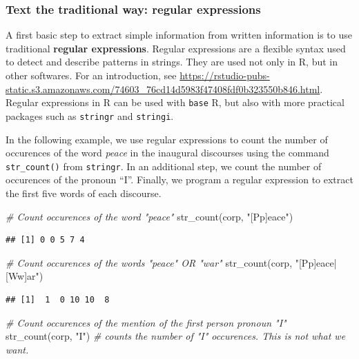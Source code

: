 \documentclass[
  12pt,
]{style/krantz}
\newenvironment{Shaded}{\begin{snugshade}}{\end{snugshade}}
\newcommand{\CommentTok}[1]{\textcolor[rgb]{0.56,0.35,0.01}{\textit{#1}}}
\newcommand{\FunctionTok}[1]{\textcolor[rgb]{0.00,0.00,0.00}{#1}}
\newcommand{\NormalTok}[1]{#1}
\newcommand{\StringTok}[1]{\textcolor[rgb]{0.31,0.60,0.02}{#1}}
\begin{document}
\hfill\break

\hypertarget{text-the-traditional-way-regular-expressions}{%
\subsubsection{Text the traditional way: regular expressions}\label{text-the-traditional-way-regular-expressions}}

A first basic step to extract simple information from written information is to use traditional \textbf{regular expressions}. Regular expressions are a flexible syntax used to detect and describe patterns in strings. They are used not only in R, but in other softwares. For an introduction, see \url{https://rstudio-pubs-static.s3.amazonaws.com/74603_76cd14d5983f47408fdf0b323550b846.html}. Regular expressions in R can be used with \texttt{base} R, but also with more practical packages such as \texttt{stringr} and \texttt{stringi}.

In the following example, we use regular expressions to count the number of occurences of the word \emph{peace} in the inaugural discourses using the command \texttt{str\_count()} from \texttt{stringr}. In an additional step, we count the number of occurences of the pronoun ``I''. Finally, we program a regular expression to extract the first five words of each discourse.

\begin{Shaded}
\begin{Highlighting}[]
\CommentTok{\# Count occurences of the word "peace"}
\FunctionTok{str\_count}\NormalTok{(corp, }\StringTok{"[Pp]eace"}\NormalTok{)}
\end{Highlighting}
\end{Shaded}

\begin{verbatim}
## [1] 0 0 5 7 4
\end{verbatim}

\begin{Shaded}
\begin{Highlighting}[]
\CommentTok{\# Count occurences of the words "peace" OR "war"}
\FunctionTok{str\_count}\NormalTok{(corp, }\StringTok{"[Pp]eace|[Ww]ar"}\NormalTok{)}
\end{Highlighting}
\end{Shaded}

\begin{verbatim}
## [1]  1  0 10 10  8
\end{verbatim}

\begin{Shaded}
\begin{Highlighting}[]
\CommentTok{\# Count occurences of the mention of the first person pronoun "I"}
\FunctionTok{str\_count}\NormalTok{(corp, }\StringTok{"I"}\NormalTok{) }\CommentTok{\# counts the number of "I" occurences. This is not what we want.}
\end{Highlighting}
\end{Shaded}
\end{document}
